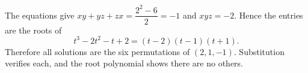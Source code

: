 The equations give $xy+yz+zx=\dfrac{2^2-6}{2}=-1$ and $xyz=-2$. Hence the entries are the roots of
\[t^3-2t^2-t+2=(t-2)(t-1)(t+1).\]
Therefore all solutions are the six permutations of $\boxed{(2,1,-1)}$. Substitution verifies each, and the root polynomial shows there are no others.

